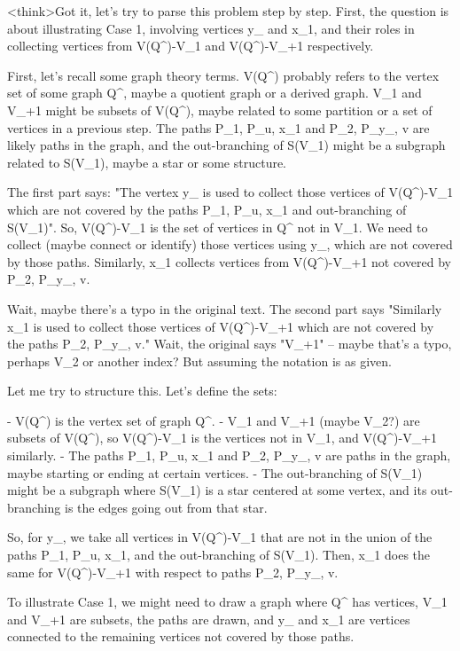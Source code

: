 <think>Got it, let's try to parse this problem step by step. First, the question is about illustrating Case 1, involving vertices y_ and x_1, and their roles in collecting vertices from V(Q^)-V_1 and V(Q^)-V_+1 respectively. 

First, let's recall some graph theory terms. V(Q^) probably refers to the vertex set of some graph Q^, maybe a quotient graph or a derived graph. V_1 and V_+1 might be subsets of V(Q^), maybe related to some partition or a set of vertices in a previous step. The paths P_1, P_u, x_1 and P_2, P_y_, v are likely paths in the graph, and the out-branching of S(V_1) might be a subgraph related to S(V_1), maybe a star or some structure.

The first part says: "The vertex y_ is used to collect those vertices of V(Q^)-V_1 which are not covered by the paths P_1, P_u, x_1 and out-branching of S(V_1)". So, V(Q^)-V_1 is the set of vertices in Q^ not in V_1. We need to collect (maybe connect or identify) those vertices using y_, which are not covered by those paths. Similarly, x_1 collects vertices from V(Q^)-V_+1 not covered by P_2, P_y_, v.

Wait, maybe there's a typo in the original text. The second part says "Similarly x_1 is used to collect those vertices of V(Q^)-V_+1 which are not covered by the paths P_2, P_y_, v." Wait, the original says "V_+1" – maybe that's a typo, perhaps V_2 or another index? But assuming the notation is as given.

Let me try to structure this. Let's define the sets:

- V(Q^) is the vertex set of graph Q^.
- V_1 and V_+1 (maybe V_2?) are subsets of V(Q^), so V(Q^)-V_1 is the vertices not in V_1, and V(Q^)-V_+1 similarly.
- The paths P_1, P_u, x_1 and P_2, P_y_, v are paths in the graph, maybe starting or ending at certain vertices.
- The out-branching of S(V_1) might be a subgraph where S(V_1) is a star centered at some vertex, and its out-branching is the edges going out from that star.

So, for y_, we take all vertices in V(Q^)-V_1 that are not in the union of the paths P_1, P_u, x_1, and the out-branching of S(V_1). Then, x_1 does the same for V(Q^)-V_+1 with respect to paths P_2, P_y_, v.

To illustrate Case 1, we might need to draw a graph where Q^ has vertices, V_1 and V_+1 are subsets, the paths are drawn, and y_ and x_1 are vertices connected to the remaining vertices not covered by those paths.

